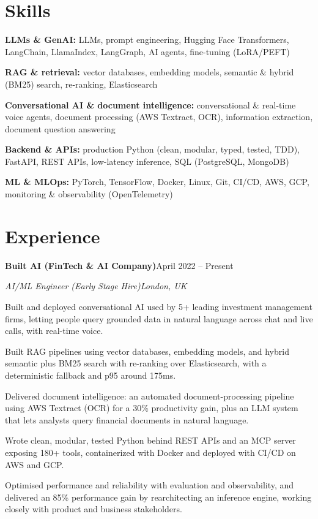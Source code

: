 \documentclass[10pt,a4paper]{article}
\newcommand{\entry}[4]{%
  {\color{company}\bfseries #1}\hfill {\color{muted}#2}\par
  \vspace{1pt}
  {\itshape #3}\hfill {\color{muted}\itshape #4}\par
  \vspace{3pt}%
}
\begin{document}
\section{Skills}
\begin{tight}
  \item[\textcolor{accent}{\small$\bullet$}] \textbf{LLMs \& GenAI:} LLMs, prompt engineering, Hugging Face Transformers, LangChain, LlamaIndex, LangGraph, AI agents, fine-tuning (LoRA/PEFT)
  \item[\textcolor{accent}{\small$\bullet$}] \textbf{RAG \& retrieval:} vector databases, embedding models, semantic \& hybrid (BM25) search, re-ranking, Elasticsearch
  \item[\textcolor{accent}{\small$\bullet$}] \textbf{Conversational AI \& document intelligence:} conversational \& real-time voice agents, document processing (AWS Textract, OCR), information extraction, document question answering
  \item[\textcolor{accent}{\small$\bullet$}] \textbf{Backend \& APIs:} production Python (clean, modular, typed, tested, TDD), FastAPI, REST APIs, low-latency inference, SQL (PostgreSQL, MongoDB)
  \item[\textcolor{accent}{\small$\bullet$}] \textbf{ML \& MLOps:} PyTorch, TensorFlow, Docker, Linux, Git, CI/CD, AWS, GCP, monitoring \& observability (OpenTelemetry)
\end{tight}

\section{Experience}
\entry{Built AI (FinTech \& AI Company)}{April 2022 -- Present}{AI/ML Engineer (Early Stage Hire)}{London, UK}
\begin{tight}
  \item Built and deployed conversational AI used by 5+ leading investment management firms, letting people query grounded data in natural language across chat and live calls, with real-time voice.
  \item Built RAG pipelines using vector databases, embedding models, and hybrid semantic plus BM25 search with re-ranking over Elasticsearch, with a deterministic fallback and p95 around 175ms.
  \item Delivered document intelligence: an automated document-processing pipeline using AWS Textract (OCR) for a 30\% productivity gain, plus an LLM system that lets analysts query financial documents in natural language.
  \item Wrote clean, modular, tested Python behind REST APIs and an MCP server exposing 180+ tools, containerized with Docker and deployed with CI/CD on AWS and GCP.
  \item Optimised performance and reliability with evaluation and observability, and delivered an 85\% performance gain by rearchitecting an inference engine, working closely with product and business stakeholders.
\end{tight}
\end{document}
